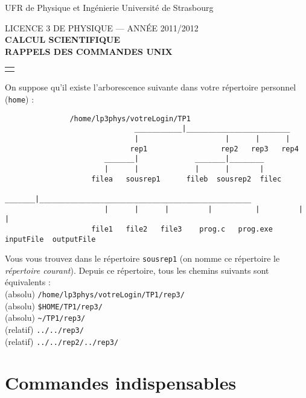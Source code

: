 \documentclass [a4paper]{article}
\newcommand{\bc}{\begin{center}}
\newcommand{\ec}{\end{center}}
\begin{document}
\noindent UFR de Physique et Ing\'enierie \hfill Universit\'e de Strasbourg

\bc
 LICENCE 3 DE PHYSIQUE --- ANN\'EE 2011/2012 \\
 
 \textbf{CALCUL SCIENTIFIQUE}\\
 
 \textbf{RAPPELS DES COMMANDES UNIX} \\
\ec
 
 
\noindent\begin{tabular}{p{17.2cm}}
 \hline
 \\
\end{tabular}

On suppose qu'il existe l'arborescence suivante dans votre répertoire personnel (\verb+home+) :

\begin{verbatim}
               /home/lp3phys/votreLogin/TP1
                              ___________|________________________
                              |                    |      |      |
                             rep1                 rep2   rep3   rep4
                       _______|             _______|________
                       |      |             |      |       |
                    filea   sousrep1      fileb  sousrep2  filec
                       _______|_________________________________________________
                       |      |      |         |          |         |          |
                    file1   file2   file3    prog.c   prog.exe  inputFile  outputFile
\end{verbatim}

Vous vous trouvez dans le répertoire {\verb+sousrep1+} (on nomme ce répertoire 
 le {\it répertoire courant}). Depuis ce répertoire, tous les chemins suivants sont équivalents :\\
(absolu)  \verb+/home/lp3phys/votreLogin/TP1/rep3/+\\
(absolu)  \verb+$HOME/TP1/rep3/+\\
(absolu)  \verb+~/TP1/rep3/+\\
(relatif) \verb+../../rep3/+\\
(relatif) \verb+../../rep2/../rep3/+\\


\section*{Commandes indispensables}
\end{document}
